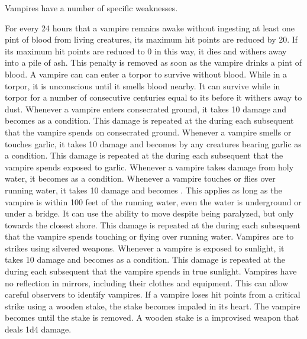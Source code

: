   Vampires have a number of specific weaknesses.
  \begin{itemize}
     For every 24 hours that a vampire remains awake without ingesting at least one pint of blood from living creatures, its maximum hit points are reduced by 20.
      If its maximum hit points are reduced to 0 in this way, it dies and withers away into a pile of ash.
      This penalty is removed as soon as the vampire drinks a pint of blood.
      A vampire can can enter a torpor to survive without blood.
      While in a torpor, it is unconscious until it smells blood nearby.
      It can survive while in torpor for a number of consecutive centuries equal to its  before it withers away to dust.
     Whenever a vampire enters consecrated ground, it takes 10 damage and becomes \stunned as a condition.
      This damage is repeated at the during each subsequent  that the vampire spends on consecrated ground.
     Whenever a vampire smells or touches garlic, it takes 10 damage and becomes \frightened by any creatures bearing garlic as a condition.
      This damage is repeated at the during each subsequent  that the vampire spends exposed to garlic.
     Whenever a vampire takes damage from holy water, it becomes \stunned as a condition.
     Whenever a vampire touches or flies over running water, it takes 10 damage and  becomes \paralyzed.
      This applies as long as the vampire is within 100 feet of the running water, even the water is underground or under a bridge.
      It can use the  ability to move despite being paralyzed, but only towards the closest shore.
      This damage is repeated at the during each subsequent  that the vampire spends touching or flying over running water.
     Vampires are \vulnerable to strikes using silvered weapons.
     Whenever a vampire is exposed to sunlight, it takes 10 damage and becomes \stunned as a condition.
      This damage is repeated at the during each subsequent  that the vampire spends in true sunlight.
     Vampires have no reflection in mirrors, including their clothes and equipment.
      This can allow careful observers to identify vampires.
     If a vampire loses hit points from a critical strike using a wooden stake, the stake becomes impaled in its heart.
      The vampire becomes \paralyzed until the stake is removed.
      A wooden stake is a  improvised weapon that deals 1d4 damage.
  \end{itemize}

